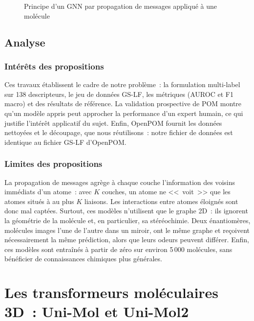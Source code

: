 \begin{figure}
   \centering
   \caption{Principe d'un GNN par propagation de messages appliqué à une molécule}
   \label{fig:GNN}
\end{figure}

\subsection{Analyse}

\subsubsection{Intérêts des propositions}

Ces travaux établissent le cadre de notre problème~: la formulation multi-label sur 138 descripteurs, le jeu de données GS-LF, les métriques (AUROC et F1 macro) et des résultats de référence.
La validation prospective de POM montre qu'un modèle appris peut approcher la performance d'un expert humain, ce qui justifie l'intérêt applicatif du sujet.
Enfin, OpenPOM fournit les données nettoyées et le découpage, que nous réutilisons~: notre fichier de données est identique au fichier GS-LF d'OpenPOM.

\subsubsection{Limites des propositions}

La propagation de messages agrège à chaque couche l'information des voisins immédiats d'un atome~: avec $K$ couches, un atome ne <<~voit~>> que les atomes situés à au plus $K$ liaisons.
Les interactions entre atomes éloignés sont donc mal captées.
Surtout, ces modèles n'utilisent que le graphe 2D~: ils ignorent la géométrie de la molécule et, en particulier, sa stéréochimie.
Deux énantiomères, molécules images l'une de l'autre dans un miroir, ont le même graphe et reçoivent nécessairement la même prédiction, alors que leurs odeurs peuvent différer.
Enfin, ces modèles sont entraînés à partir de zéro sur environ 5\,000 molécules, sans bénéficier de connaissances chimiques plus générales.


\section{Les transformeurs moléculaires 3D~: Uni-Mol et Uni-Mol2}
\label{sec:EAUniMol}

